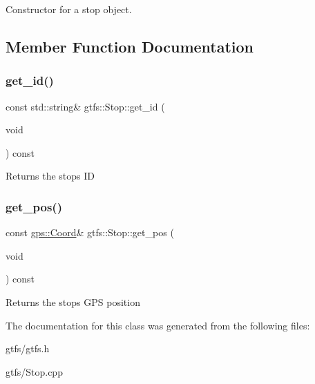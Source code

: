 Constructor for a stop object. 

\subsection{Member Function Documentation}
\mbox{\label{classgtfs_1_1Stop_a95f4a615a6e06eed430a14d783557a29}} 
\subsubsection{\texorpdfstring{get\+\_\+id()}{get\_id()}}
{\footnotesize\ttfamily const std\+::string\& gtfs\+::\+Stop\+::get\+\_\+id (\begin{DoxyParamCaption}\item[{void}]{ }\end{DoxyParamCaption}) const\hspace{0.3cm}{\ttfamily [inline]}}

\begin{DoxyReturn}{Returns}
the stop\textquotesingle{}s ID 
\end{DoxyReturn}
\mbox{\label{classgtfs_1_1Stop_acdd72b43e30c15819f16807b5c6a45d3}} 
\subsubsection{\texorpdfstring{get\+\_\+pos()}{get\_pos()}}
{\footnotesize\ttfamily const \hyperlink{classgps_1_1Coord}{gps\+::\+Coord}\& gtfs\+::\+Stop\+::get\+\_\+pos (\begin{DoxyParamCaption}\item[{void}]{ }\end{DoxyParamCaption}) const\hspace{0.3cm}{\ttfamily [inline]}}

\begin{DoxyReturn}{Returns}
the stop\textquotesingle{}s G\+PS position 
\end{DoxyReturn}


The documentation for this class was generated from the following files\+:\begin{DoxyCompactItemize}
\item 
gtfs/gtfs.\+h\item 
gtfs/Stop.\+cpp\end{DoxyCompactItemize}
